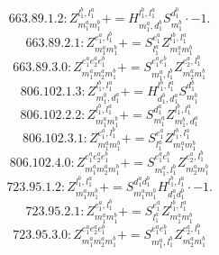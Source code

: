 \documentclass[letterpaper,10pt,fleqn,leqno,onecolumn]{article}
\begin{document}
\begin{equation} \;\;\;\;\;\;  663.89.1.2: Z^{l_{1}^{b},l_{1}^{a}}_{m_{1}^{a}m_{1}^{b}}+=H^{l_{1}^{b},l_{1}^{a}}_{m_{1}^{a},d_{1}^{b}}S^{d_{1}^{b}}_{m_{1}^{b}}\cdot -1. \end{equation}
\begin{equation} \;\;\;\;\;\;  663.89.2.1: Z^{e_{1}^{a},l_{1}^{b}}_{m_{1}^{a}m_{1}^{b}}+=S^{e_{1}^{a}}_{l_{1}^{a}}Z^{l_{1}^{b},l_{1}^{a}}_{m_{1}^{a}m_{1}^{b}} \end{equation}
\begin{equation} \;\;\;\;\;\;  663.89.3.0: Z^{e_{1}^{a}e_{2}^{a}e_{1}^{b}}_{m_{1}^{a}m_{2}^{a}m_{1}^{b}}+=S^{e_{1}^{a}e_{1}^{b}}_{m_{1}^{a},l_{1}^{b}}Z^{e_{2}^{a},l_{1}^{b}}_{m_{2}^{a}m_{1}^{b}} \end{equation}
\begin{equation} \;\;\;\;\;\;  806.102.1.3: Z^{l_{1}^{b},l_{1}^{a}}_{m_{1}^{b},d_{1}^{a}}+=H^{l_{1}^{b},l_{1}^{a}}_{d_{1}^{b},d_{1}^{a}}S^{d_{1}^{b}}_{m_{1}^{b}} \end{equation}
\begin{equation} \;\;\;\;\;\;  806.102.2.2: Z^{l_{1}^{b},l_{1}^{a}}_{m_{1}^{a}m_{1}^{b}}+=S^{d_{1}^{a}}_{m_{1}^{a}}Z^{l_{1}^{b},l_{1}^{a}}_{m_{1}^{b},d_{1}^{a}} \end{equation}
\begin{equation} \;\;\;\;\;\;  806.102.3.1: Z^{e_{1}^{a},l_{1}^{b}}_{m_{1}^{a}m_{1}^{b}}+=S^{e_{1}^{a}}_{l_{1}^{a}}Z^{l_{1}^{b},l_{1}^{a}}_{m_{1}^{a}m_{1}^{b}} \end{equation}
\begin{equation} \;\;\;\;\;\;  806.102.4.0: Z^{e_{1}^{a}e_{2}^{a}e_{1}^{b}}_{m_{1}^{a}m_{2}^{a}m_{1}^{b}}+=S^{e_{1}^{a}e_{1}^{b}}_{m_{1}^{a},l_{1}^{b}}Z^{e_{2}^{a},l_{1}^{b}}_{m_{2}^{a}m_{1}^{b}} \end{equation}
\begin{equation} \;\;\;\;\;\;  723.95.1.2: Z^{l_{1}^{b},l_{1}^{a}}_{m_{1}^{a}m_{1}^{b}}+=S^{d_{1}^{a}d_{1}^{b}}_{m_{1}^{a}m_{1}^{b}}H^{l_{1}^{b},l_{1}^{a}}_{d_{1}^{a}d_{1}^{b}}\cdot -1. \end{equation}
\begin{equation} \;\;\;\;\;\;  723.95.2.1: Z^{e_{1}^{a},l_{1}^{b}}_{m_{1}^{a}m_{1}^{b}}+=S^{e_{1}^{a}}_{l_{1}^{a}}Z^{l_{1}^{b},l_{1}^{a}}_{m_{1}^{a}m_{1}^{b}} \end{equation}
\begin{equation} \;\;\;\;\;\;  723.95.3.0: Z^{e_{1}^{a}e_{2}^{a}e_{1}^{b}}_{m_{1}^{a}m_{2}^{a}m_{1}^{b}}+=S^{e_{1}^{a}e_{1}^{b}}_{m_{1}^{a},l_{1}^{b}}Z^{e_{2}^{a},l_{1}^{b}}_{m_{2}^{a}m_{1}^{b}} \end{equation}
\end{document}
